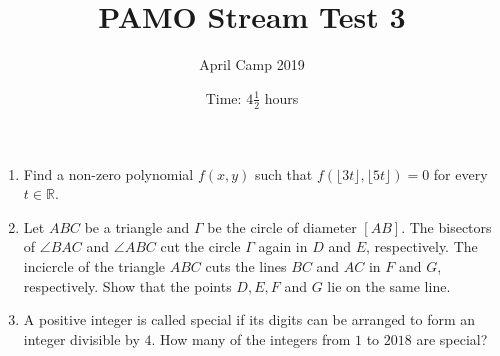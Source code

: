 \documentclass[a4paper, 12pt]{article}
\title{PAMO Stream Test 3}
\author{April Camp 2019}
\date{Time: $4 \frac{1}{2}$ hours}
\begin{document}
 \maketitle

\begin{enumerate}

\item Find a non-zero polynomial $f(x, y)$ such that $f(\lfloor 3t \rfloor, \lfloor 5t \rfloor) = 0$ for every $t \in \mathbb{R}$.


\item Let $ABC$ be a triangle and $\Gamma$ be the circle of diameter $[AB]$. The bisectors of $\angle BAC$ and $\angle ABC$ cut the circle $\Gamma$ again in $D$ and $E$, respectively. The incicrcle of the triangle $ABC$ cuts the lines $BC$ and $AC$ in $F$ and $G$, respectively. Show that the points $D, E, F$ and $G$ lie on the same line.


\item A positive integer is called special if its digits can be arranged to form an integer divisible by $4$. How many of the integers from $1$ to $2018$ are special?


\end{enumerate}

\vfill

\centering

\vspace{12mm}
\end{document}

